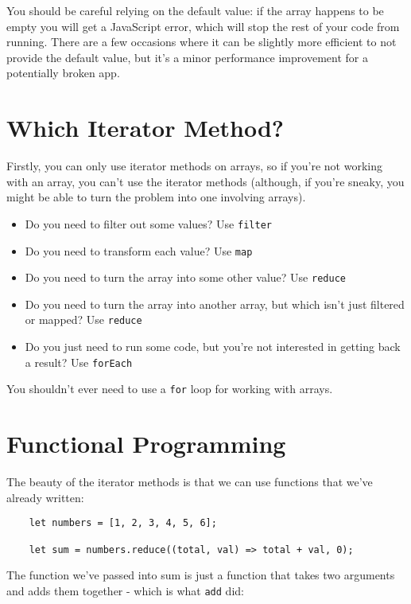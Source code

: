 You should be careful relying on the default value: if the array happens to be empty you will get a JavaScript error, which will stop the rest of your code from running. There are a few occasions where it can be slightly more efficient to not provide the default value, but it's a minor performance improvement for a potentially broken app.



\section{Which Iterator Method?}

Firstly, you can only use iterator methods on arrays, so if you're not working with an array, you can't use the iterator methods (although, if you're sneaky, you might be able to turn the problem into one involving arrays).

\begin{itemize}
    \item Do you need to filter out some values? Use \texttt{filter}
    \item Do you need to transform each value? Use \texttt{map}
    \item Do you need to turn the array into some other value? Use \texttt{reduce}
    \item Do you need to turn the array into another array, but which isn't just filtered or mapped? Use \texttt{reduce}
    \item Do you just need to run some code, but you're not interested in getting back a result? Use \texttt{forEach}
\end{itemize}

You shouldn't ever need to use a \texttt{for} loop for working with arrays.


\pagebreak

\section{Functional Programming}

The beauty of the iterator methods is that we can use functions that we've already written:

\begin{verbatim}
    let numbers = [1, 2, 3, 4, 5, 6];

    let sum = numbers.reduce((total, val) => total + val, 0);
\end{verbatim}

The function we've passed into sum is just a function that takes two arguments and adds them together - which is what \texttt{add} did:

